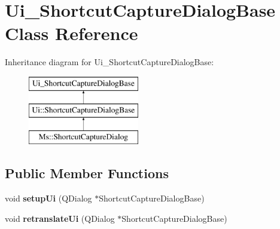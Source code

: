 \hypertarget{class_ui___shortcut_capture_dialog_base}{}\section{Ui\+\_\+\+Shortcut\+Capture\+Dialog\+Base Class Reference}
\label{class_ui___shortcut_capture_dialog_base}
Inheritance diagram for Ui\+\_\+\+Shortcut\+Capture\+Dialog\+Base\+:\begin{figure}[H]
\begin{center}
\leavevmode
\includegraphics[height=3.000000cm]{class_ui___shortcut_capture_dialog_base}
\end{center}
\end{figure}
\subsection*{Public Member Functions}
\begin{DoxyCompactItemize}
\item 
\mbox{\label{class_ui___shortcut_capture_dialog_base_a005863f26c92d9b4c17270c6dbaaf85d}} 
void {\bfseries setup\+Ui} (Q\+Dialog $\ast$Shortcut\+Capture\+Dialog\+Base)
\item 
\mbox{\label{class_ui___shortcut_capture_dialog_base_aaa72835b58fc3afd1b2897f48108ca9d}} 
void {\bfseries retranslate\+Ui} (Q\+Dialog $\ast$Shortcut\+Capture\+Dialog\+Base)
\end{DoxyCompactItemize}
